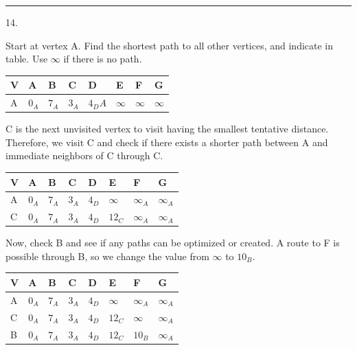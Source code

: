 \documentclass{article}
\begin{document}
\noindent\rule{8cm}{0.4pt}

14. 

Start at vertex A. Find the shortest path to all other vertices, and indicate in table. Use $\infty$ if there is no path. 


\begin{table}[H]
\begin{tabular}{|l|l|l|l|l|l|l|l|}
\hline
V & \textbf{A} & B & C & D & E & F & G \\ \hline
A & $0_A$ & $7_A$ & $3_A$ & $4_DA$ & $\infty$ & $\infty$ & $\infty$ \\ \hline
\end{tabular}
\end{table}

C is the next unvisited vertex to visit having the smallest tentative distance. Therefore, we visit C and check if there exists a shorter path between A and immediate neighbors of C through C. 



\begin{table}[H]
\begin{tabular}{|l|l|l|l|l|l|l|l|}
\hline
V & \textbf{A} & B & \textbf{C} & D & E & F & G \\ \hline
A & $0_A$ & $7_A$ & $3_A$ & $4_D$ & $\infty$ & $\infty_A$ & $\infty_A$ \\ \hline
C & $0_A$ & $7_A$ & $3_A$ & $4_D$ & $12_C$ & $\infty_A$ & $\infty_A$ \\ \hline
\end{tabular}
\end{table}

Now, check B and see if any paths can be optimized or created. A route to F is possible through B, so we change the value from $\infty$ to $10_B$. 

\begin{table}[H]
\begin{tabular}{|l|l|l|l|l|l|l|l|}
\hline
V & \textbf{A} & \textbf{B} & \textbf{C} & D & E & F & G \\ \hline
A & $0_A$ & $7_A$ & $3_A$ & $4_D$ & $\infty$ & $\infty_A$ & $\infty_A$ \\ \hline
C & $0_A$ & $7_A$ & $3_A$ & $4_D$ & $12_C$ & $\infty$ & $\infty_A$ \\ \hline
B & $0_A$ & $7_A$ & $3_A$ & $4_D$ & $12_C$ & $10_B$ & $\infty_A$ \\ \hline
\end{tabular}
\end{table}
\end{document}
